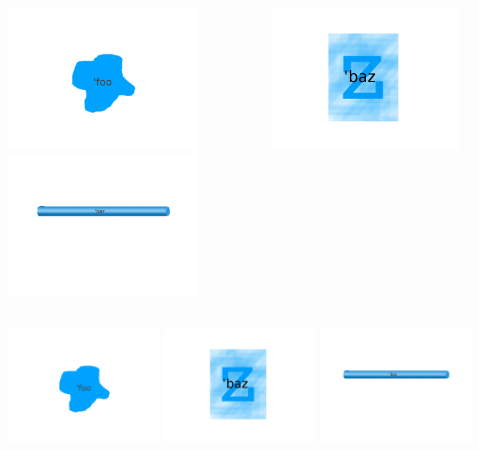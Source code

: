 \documentclass{beamer}
\begin{document}
{\begin{frame}
    \begin{columns}[T]
    \begin{column}[T]{5cm}
    \includegraphics[width=5cm, trim= 4cm 4cm 4cm 4cm]{foo-instance}\\
    \includegraphics[width=5cm, trim= 4cm 4cm 4cm 4cm]{bar-instance}
    \end{column}
    \begin{column}[T]{4cm}
    \includegraphics[width=5cm]{baz-instance}
    \end{column}
    \end{columns}
\end{frame}

\begin{frame}
    \includegraphics[width=4cm, trim= 4cm 4cm 4cm 4cm]{foo-instance}
    \includegraphics[width=4cm, trim= 4cm 4cm 4cm 4cm]{baz-instance}
    \includegraphics[width=4cm, trim= 4cm 4cm 4cm 4cm]{bar-instance}


\end{frame}}
\end{document}
